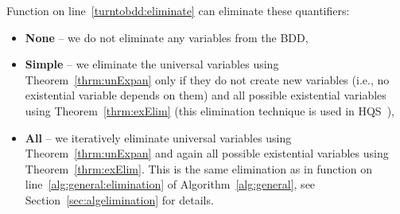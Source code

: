 \documentclass[
  digital, %
  color,
  twoside, %
  table,   %
  nolof,     %
  nolot,     %
]{fithesis3}
\theoremstyle{definition}
\theoremstyle{remark}
\newcommand{\QEnone}{\textbf{None}}
\newcommand{\QEsimple}{\textbf{Simple}}
\newcommand{\QEall}{\textbf{All}}
\begin{document}
Function  on line~\ref{turntobdd:eliminate} can eliminate these quantifiers:
\begin{itemize}
    \item \QEnone{} -- we do not eliminate any variables from the BDD,
    \item \QEsimple{} -- we eliminate the universal variables using Theorem~\ref{thrm:unExpan} only if they do not create new variables (i.e., no existential variable depends on them) and all possible existential variables using Theorem~\ref{thrm:exElim} (this elimination technique is used in HQS~\cite{HQSquantifierLocalisation}), %
    \item \QEall{} -- we iteratively eliminate universal variables using Theorem~\ref{thrm:unExpan} and again all possible existential variables using Theorem~\ref{thrm:exElim}. This is the same elimination as in function  on line~\ref{alg:general:elimination} of Algorithm~\ref{alg:general}, see Section~\ref{sec:algelimination} for details. %
\end{itemize}
\end{document}
